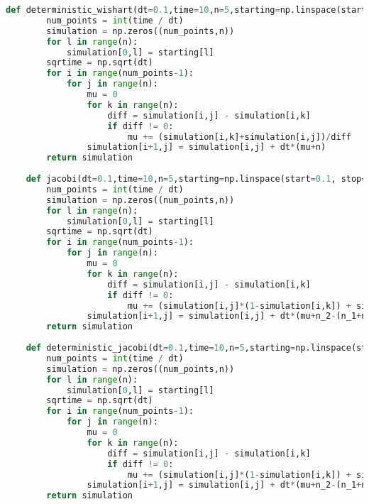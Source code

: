 \begin{lstlisting}[language=Python, caption=Euler-Maruyama algorithm for simulation of eigenvalue processes]
    def deterministic_wishart(dt=0.1,time=10,n=5,starting=np.linspace(start=0, stop=5, num=5)):
        num_points = int(time / dt)
        simulation = np.zeros((num_points,n))
        for l in range(n):
            simulation[0,l] = starting[l]
        sqrtime = np.sqrt(dt)
        for i in range(num_points-1):
            for j in range(n):
                mu = 0
                for k in range(n):
                    diff = simulation[i,j] - simulation[i,k]
                    if diff != 0:
                        mu += (simulation[i,k]+simulation[i,j])/diff
                simulation[i+1,j] = simulation[i,j] + dt*(mu+n)
        return simulation
    
    def jacobi(dt=0.1,time=10,n=5,starting=np.linspace(start=0.1, stop=0.9, num=5),n_1=5,n_2=5):
        num_points = int(time / dt)
        simulation = np.zeros((num_points,n))
        for l in range(n):
            simulation[0,l] = starting[l]
        sqrtime = np.sqrt(dt)
        for i in range(num_points-1):
            for j in range(n):
                mu = 0
                for k in range(n):
                    diff = simulation[i,j] - simulation[i,k]
                    if diff != 0:
                        mu += (simulation[i,j]*(1-simulation[i,k]) + simulation[i,k]*(1-simulation[i,j]))/diff
                simulation[i+1,j] = simulation[i,j] + dt*(mu+n_2-(n_1+n_2)*simulation[i,j]) + 2*sqrtime*np.random.randn()*np.sqrt(simulation[i,j]*(1-simulation[i,j]))
        return simulation
    
    def deterministic_jacobi(dt=0.1,time=10,n=5,starting=np.linspace(start=0.1, stop=0.9, num=5),n_1=5,n_2=5):
        num_points = int(time / dt)
        simulation = np.zeros((num_points,n))
        for l in range(n):
            simulation[0,l] = starting[l]
        sqrtime = np.sqrt(dt)
        for i in range(num_points-1):
            for j in range(n):
                mu = 0
                for k in range(n):
                    diff = simulation[i,j] - simulation[i,k]
                    if diff != 0:
                        mu += (simulation[i,j]*(1-simulation[i,k]) + simulation[i,k]*(1-simulation[i,j]))/diff
                simulation[i+1,j] = simulation[i,j] + dt*(mu+n_2-(n_1+n_2)*simulation[i,j]) 
        return simulation
\end{lstlisting}